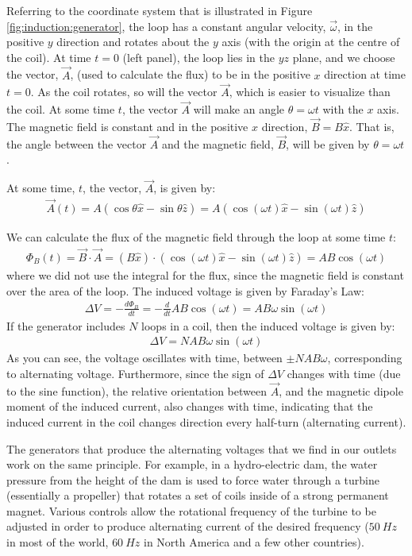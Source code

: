 Referring to the coordinate system that is illustrated in Figure \ref{fig:induction:generator}, the loop has a constant angular velocity, $\vec\omega$, in the positive $y$ direction and rotates about the $y$ axis (with the origin at the centre of the coil). At time $t=0$ (left panel), the loop lies in the $yz$ plane, and we choose the vector, $\vec A$, (used to calculate the flux) to be in the positive $x$ direction at time $t=0$. As the coil rotates, so will the vector $\vec A$, which is easier to visualize than the coil. At some time $t$, the vector $\vec A$ will make an angle $\theta=\omega t$ with the $x$ axis. The magnetic field is constant and in the positive $x$ direction, $\vec B = B\hat x$. That is, the angle between the vector $\vec A$ and the magnetic field, $\vec B$, will be given by $\theta = \omega t$. 

At some time, $t$, the vector, $\vec A$, is given by:
\begin{align*}
\vec A(t) = A(\cos\theta \hat x -\sin\theta \hat z) = A(\cos(\omega t) \hat x -\sin(\omega t)\hat z)
\end{align*}

We can calculate the flux of the magnetic field through the loop at some time $t$:
\begin{align*}
\Phi_B(t) =  \vec B \cdot \vec A = (B\hat x) \cdot (\cos(\omega t) \hat x -\sin(\omega t)\hat z)=AB\cos(\omega t)
\end{align*}
where we did not use the integral for the flux, since the magnetic field is constant over the area of the loop. The induced voltage is given by Faraday's Law:
\begin{align*}
\Delta V = - \frac{d\Phi_B}{dt}  =  - \frac{d}{dt}AB\cos(\omega t) =  AB\omega\sin(\omega t)
\end{align*}
If the generator includes $N$ loops in a coil, then the induced voltage is given by:
\begin{align*}
\Delta V = NAB\omega\sin(\omega t)
\end{align*}
As you can see, the voltage oscillates with time, between $\pm NAB\omega$, corresponding to alternating voltage. Furthermore, since the sign of $\Delta V$ changes with time (due to the sine function), the relative orientation between $\vec A$, and the magnetic dipole moment of the induced current, also changes with time, indicating that the induced current in the coil changes direction every half-turn (alternating current).

The generators that produce the alternating voltages that we find in our outlets work on the same principle. For example, in a hydro-electric dam, the water pressure from the height of the dam is used to force water through a turbine (essentially a propeller) that rotates a set of coils inside of a strong permanent magnet. Various controls allow the rotational frequency of the turbine to be adjusted in order to produce alternating current of the desired frequency ($\SI{50}{Hz}$ in most of the world, $\SI{60}{Hz}$ in North America and a few other countries).

